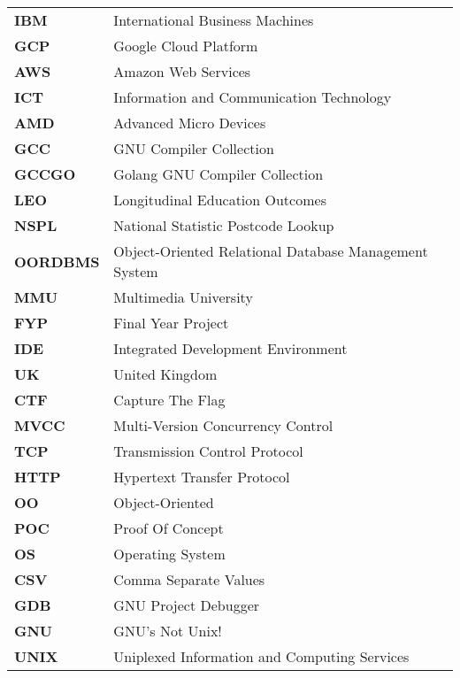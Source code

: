 \documentclass[12pt, oneside]{Thesis}
\begin{document}
\pagestyle{fancy} %
%
\pagebreak
{} 
%
%
\begin{table}[ht]
	\begin{tabular}{p{2.5cm}p{11.0cm}}
		
		\textbf{IBM} & International Business Machines\\
		\textbf{GCP} & Google Cloud Platform\\
		\textbf{AWS} & Amazon Web Services\\
		\textbf{ICT} & Information and Communication Technology\\
		\textbf{AMD} & Advanced Micro Devices\\
		\textbf{GCC} & GNU Compiler Collection\\
		\textbf{GCCGO} & Golang GNU Compiler Collection\\
		\textbf{LEO} & Longitudinal Education Outcomes \\
		\textbf{NSPL} & National Statistic Postcode Lookup\\
		\textbf{OORDBMS} & Object-Oriented Relational Database Management System\\
		\textbf{MMU} & Multimedia University\\
		\textbf{FYP} & Final Year Project\\
		\textbf{IDE} & Integrated Development Environment\\
		\textbf{UK} & United Kingdom\\
		\textbf{CTF} & Capture The Flag\\ 
		\textbf{MVCC} & Multi-Version Concurrency Control\\
		\textbf{TCP} & Transmission Control Protocol\\
		\textbf{HTTP} & Hypertext Transfer Protocol\\
		\textbf{OO} & Object-Oriented\\
		\textbf{POC} & Proof Of Concept\\
		\textbf{OS} & Operating System\\
		\textbf{CSV} & Comma Separate Values\\
		\textbf{GDB} & GNU Project Debugger\\
		\textbf{GNU} & GNU's Not Unix!\\
		\textbf{UNIX} & Uniplexed Information and Computing Services\\

\end{tabular}
\end{table}
\end{document}
